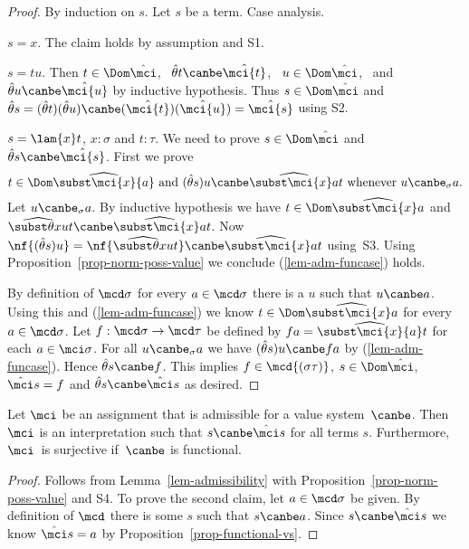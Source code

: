\begin{proof}
  By induction on $s$.  Let $s$ be a term.  Case
  analysis.

  \br $s=x$.  The claim holds by assumption and S1.

  \br $s=tu$.  Then $t\in\Dom\hat\mci$, \
  $\hat\theta{t}\canbe\hat\mci{t}$, \
  $u\in\Dom\hat\mci$, \ and
  $\hat\theta{u}\canbe\hat\mci{u}$ by inductive
  hypothesis.  Thus $s\in\Dom\hat\mci$ and
  $\hat\theta{s}= (\hat\theta{t})(\hat\theta{u})\canbe
  (\hat\mci{t})(\hat\mci{u})=\hat\mci{s}$ using S2.

  \br $s=\lam{x}t$, $x:\sigma$ and $t:\tau$.  
  We need to prove $s\in\Dom\hat\mci$ and $\hat\theta{s}\canbe\hat\mci{s}$.
  First we prove
  \begin{equation}\label{lem-adm-funcase}
    t\in\Dom\widehat{\subst\mci{x}{a}} {\mbox{ and }} (\hat\theta{s})u\canbe \widehat{\subst\mci{x}a}t {\mbox{ whenever }} u\canbe_\sigma a.  
  \end{equation}
  Let $u\canbe_\sigma a$.  
  By inductive hypothesis we have $t\in\Dom\widehat{\subst\mci{x}a}$
  and $\widehat{\subst\theta{x}u}t\canbe
  \widehat{\subst\mci{x}a}t$.
  Now
  $\nf{(\hat\theta{s})u}=
  \nf{\widehat{\subst\theta{x}u}t}\canbe
  \widehat{\subst\mci{x}a}t$ using~S3.
  Using Proposition~\ref{prop-norm-poss-value} we conclude (\ref{lem-adm-funcase}) holds.

  By definition of $\mcd\sigma$ for every $a\in\mcd\sigma$ there is a $u$ such that $u\canbe a$.
  Using this and (\ref{lem-adm-funcase}) we know $t\in\Dom\widehat{\subst\mci{x}a}$ for every $a\in\mcd\sigma$.
  Let $f:\mcd\sigma\to\mcd\tau$ be defined by $fa = \widehat{\subst\mci{x}{a}}{t}$
  for each $a\in\mci\sigma$.  
  For all $u\canbe_\sigma a$ we have $(\hat\theta{s})u\canbe fa$ by (\ref{lem-adm-funcase}).
  Hence $\hat\theta{s}\canbe f$.
  This implies $f\in\mcd{(\sigma\tau)}$, $s\in\Dom\hat\mci$, $\hat\mci s = f$
  and $\hat\theta{s}\canbe \hat\mci s$ as desired.
\end{proof}

\begin{thm}
  \label{theo-admissible-interpretations}
  Let $\mci$ be an assignment that is admissible
  for a value system~$\canbe$.  Then $\mci$ is an
  interpretation such that $s\canbe\hat\mci s$ for all
  terms $s$.  Furthermore, $\mci$~is surjective
  if~$\canbe$ is functional.
\end{thm}

\begin{proof}
  Follows from Lemma~\ref{lem-admissibility} with
  Proposition~\ref{prop-norm-poss-value} and S4.
  To prove the second claim, let $a\in\mcd\sigma$ be given.  By definition of $\mcd$ there is some $s$ such that $s\canbe a$.
  Since $s\canbe\hat\mci s$ we know $\hat\mci s = a$ by
  Proposition~\ref{prop-functional-vs}. \end{proof}










